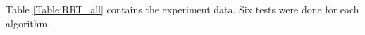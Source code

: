 Table \ref{Table:RRT_all} contains the experiment data. Six tests were done for each algorithm.
%
%
%
%
%
%
%
%
%
